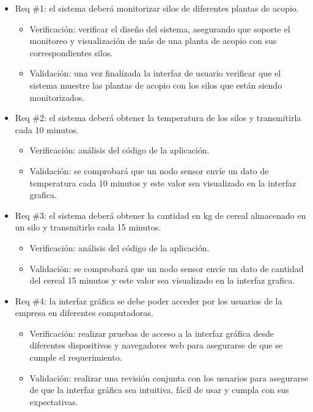 \documentclass[
11pt, %
]{charter}
\begin{document}
\begin{itemize} 
\item Req \#1: el sistema deberá monitorizar silos de diferentes plantas de acopio.
\begin{itemize}
	\item Verificación: verificar el diseño del sistema, asegurando que soporte el monitoreo y visualización de más de una planta de acopio con sus correspondientes silos. 
	\item Validación: una vez finalizada la interfaz de usuario verificar que el sistema muestre las plantas de acopio con los silos que están siendo monitorizados. 
\end{itemize}

\item Req \#2: el sistema deberá obtener la temperatura de los silos y transmitirla cada 10 minutos.
\begin{itemize}
	\item Verificación: análisis del código de la aplicación.
	\item Validación: se comprobará que un nodo sensor envíe un dato de temperatura cada 10 minutos y este valor sea visualizado en la interfaz grafica. 
\end{itemize}

\item Req \#3: el sistema deberá obtener la cantidad en kg de cereal almacenado en un silo y
transmitirlo cada 15 minutos.
\begin{itemize}
	\item Verificación: análisis del código de la aplicación.
	\item Validación: se comprobará que un nodo sensor envíe un dato de cantidad del cereal 15 minutos y este valor sea visualizado en la interfaz grafica. 
\end{itemize}

\item Req \#4: la interfaz gráfica se debe poder acceder por los usuarios de la empresa en diferentes computadoras.
\begin{itemize}
	\item Verificación: realizar pruebas de acceso a la interfaz gráfica desde diferentes dispositivos y navegadores web para asegurarse de que se cumple el requerimiento.
	\item Validación: realizar una revisión conjunta con los usuarios para asegurarse de que la interfaz gráfica sea intuitiva, fácil de usar y cumpla con sus expectativas.
\end{itemize}


\end{itemize}
\end{document}
